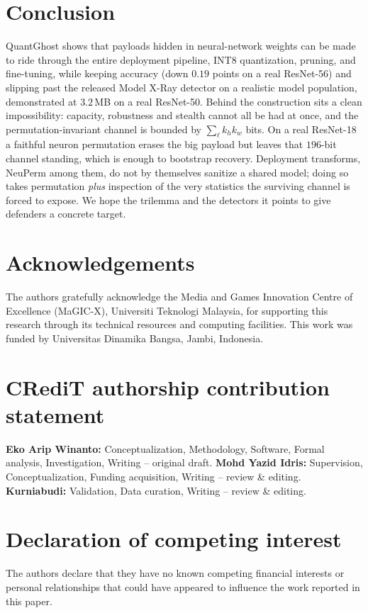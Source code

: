 \documentclass[a4paper,fleqn]{cas-dc}
\theoremstyle{plain}
\theoremstyle{remark}
\newcommand{\sys}{\mbox{QuantGhost}}
\begin{document}
\section{Conclusion}\label{sec:concl}
\sys{} shows that payloads hidden in neural-network weights can be made to ride through
the entire deployment pipeline, INT8 quantization, pruning, and fine-tuning, while
keeping accuracy (down $0.19$ points on a real ResNet-56) and slipping past the released
Model X-Ray detector on a realistic model population, demonstrated at $3.2$\,MB on a real
ResNet-50. Behind the construction sits a clean impossibility: capacity, robustness and
stealth cannot all be had at once, and the permutation-invariant channel is bounded by
$\sum_\ell k_h k_w$ bits. On a real ResNet-18 a faithful neuron permutation erases the
big payload but leaves that $196$-bit channel standing, which is enough to bootstrap
recovery. Deployment transforms, NeuPerm among them, do not by themselves sanitize a
shared model; doing so takes permutation \emph{plus} inspection of the very statistics
the surviving channel is forced to expose. We hope the trilemma and the detectors it
points to give defenders a concrete target.

\section*{Acknowledgements}
The authors gratefully acknowledge the Media and Games Innovation Centre of Excellence
(MaGIC-X), Universiti Teknologi Malaysia, for supporting this research through its
technical resources and computing facilities. This work was funded by Universitas
Dinamika Bangsa, Jambi, Indonesia.

\section*{CRediT authorship contribution statement}
\textbf{Eko Arip Winanto:} Conceptualization, Methodology, Software, Formal analysis,
Investigation, Writing -- original draft. \textbf{Mohd Yazid Idris:} Supervision,
Conceptualization, Funding acquisition, Writing -- review \& editing.
\textbf{Kurniabudi:} Validation, Data curation, Writing -- review \& editing.

\section*{Declaration of competing interest}
The authors declare that they have no known competing financial interests or personal
relationships that could have appeared to influence the work reported in this paper.
\end{document}
